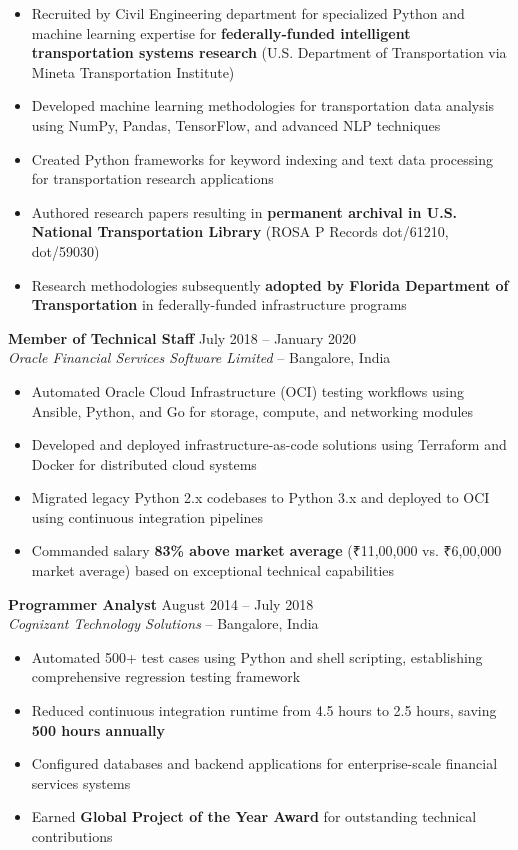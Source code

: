 \documentclass[11pt]{article}
\begin{document}
\begin{itemize}
    \item Recruited by Civil Engineering department for specialized Python and machine learning expertise for \textbf{federally-funded intelligent transportation systems research} (U.S. Department of Transportation via Mineta Transportation Institute)
    \item Developed machine learning methodologies for transportation data analysis using NumPy, Pandas, TensorFlow, and advanced NLP techniques
    \item Created Python frameworks for keyword indexing and text data processing for transportation research applications
    \item Authored research papers resulting in \textbf{permanent archival in U.S. National Transportation Library} (ROSA P Records dot/61210, dot/59030)
    \item Research methodologies subsequently \textbf{adopted by Florida Department of Transportation} in federally-funded infrastructure programs
\end{itemize}

\textbf{Member of Technical Staff} \hfill July 2018 -- January 2020\\
\textit{Oracle Financial Services Software Limited} -- Bangalore, India

\begin{itemize}
    \item Automated Oracle Cloud Infrastructure (OCI) testing workflows using Ansible, Python, and Go for storage, compute, and networking modules
    \item Developed and deployed infrastructure-as-code solutions using Terraform and Docker for distributed cloud systems
    \item Migrated legacy Python 2.x codebases to Python 3.x and deployed to OCI using continuous integration pipelines
    \item Commanded salary \textbf{83\% above market average} (₹11,00,000 vs. ₹6,00,000 market average) based on exceptional technical capabilities
\end{itemize}

\textbf{Programmer Analyst} \hfill August 2014 -- July 2018\\
\textit{Cognizant Technology Solutions} -- Bangalore, India

\begin{itemize}
    \item Automated 500+ test cases using Python and shell scripting, establishing comprehensive regression testing framework
    \item Reduced continuous integration runtime from 4.5 hours to 2.5 hours, saving \textbf{500 hours annually}
    \item Configured databases and backend applications for enterprise-scale financial services systems
    \item Earned \textbf{Global Project of the Year Award} for outstanding technical contributions
\end{itemize}
\end{document}
